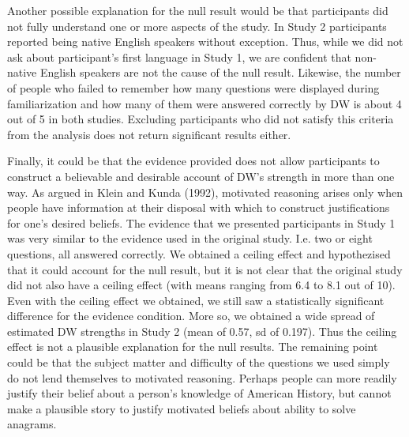\documentclass{article}
\begin{document}
Another possible explanation for the null result would be that participants did not fully understand one or more aspects of the study. In Study 2 participants reported being native English speakers without exception. Thus, while we did not ask about participant's first language in Study 1, we are confident that non-native English speakers are not the cause of the null result. Likewise, the number of people who failed to remember how many questions were displayed during familiarization and how many of them were answered correctly by DW is about 4 out of 5 in both studies. Excluding participants who did not satisfy this criteria from the analysis does not return significant results either. 

Finally, it could be that the evidence provided does not allow participants to construct a believable and desirable account of DW's strength in more than one way. As argued in Klein and Kunda (1992), motivated reasoning arises only when people have information at their disposal with which to construct justifications for one's desired beliefs. The evidence that we presented participants in Study 1 was very similar to the evidence used in the original study. I.e. two or eight questions, all answered correctly. We obtained a ceiling effect and hypothezised that it could account for the null result, but it is not clear that the original study did not also have a ceiling effect (with means ranging from 6.4 to 8.1 out of 10). Even with the ceiling effect we obtained, we still saw a statistically significant difference for the evidence condition. More so, we obtained a wide spread of estimated DW strengths in Study 2 (mean of 0.57, sd of 0.197). Thus the ceiling effect is not a plausible explanation for the null results. The remaining point could be that the subject matter and difficulty of the questions we used simply do not lend themselves to motivated reasoning. Perhaps people can more readily justify their belief about a person's knowledge of American History, but cannot make a plausible story to justify motivated beliefs about ability to solve anagrams. 



\setlength{\bibleftmargin}{.125in}
\setlength{\bibindent}{-\bibleftmargin}


\end{document}
